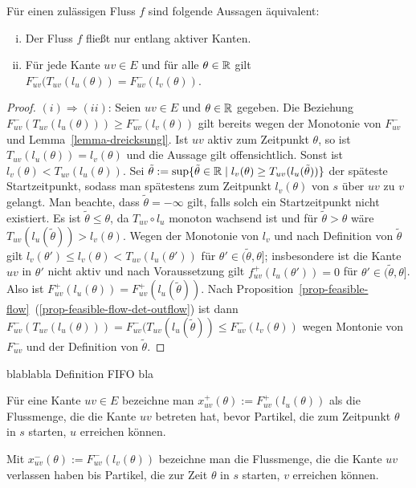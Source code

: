 \begin{lemma}
	Für einen zulässigen Fluss $f$ sind folgende Aussagen äquivalent:
	\begin{enumerate}[(i)]
		\item Der Fluss $f$ fließt nur entlang aktiver Kanten.
		\item Für jede Kante $uv\in E$ und für alle $\theta\in\mathbb{R}$ gilt $F_{uv}^-(T_{uv}(l_u(\theta)) = F_{uv}^-(l_v(\theta))$.
	\end{enumerate}
\end{lemma}
\begin{proof}
	$(i)\Rightarrow (ii)$: Seien $uv\in E$ und $\theta\in\mathbb{R}$ gegeben.
	Die Beziehung $F_{uv}^-(T_{uv}(l_u(\theta))) \geq F_{uv}^-(l_v(\theta))$ gilt bereits wegen der Monotonie von $F_{uv}^-$ und Lemma~\ref{lemma-dreicksungl}.
	Ist $uv$ aktiv zum Zeitpunkt $\theta$, so ist $T_{uv}(l_u(\theta))=l_v(\theta)$ und die Aussage gilt offensichtlich.
	Sonst ist $l_v(\theta) < T_{uv}(l_u(\theta))$. 
	Sei $\tilde{\theta}:=\sup\{ \tilde{\theta}\in\mathbb{R} \mid l_v(\theta) \geq T_{uv}(l_u(\tilde{\theta})) \}$ der späteste Startzeitpunkt, sodass man spätestens zum Zeitpunkt $l_v(\theta)$ von $s$ über $uv$ zu $v$ gelangt.
	Man beachte, dass $\tilde{\theta}=-\infty$ gilt, falls solch ein Startzeitpunkt nicht existiert.
	Es ist $\tilde{\theta} \leq \theta$, da $T_{uv}\circ l_u$ monoton wachsend ist und für $\tilde{\theta} > \theta$ wäre $T_{uv}(l_u(\tilde{\theta})) > l_v(\theta)$.
	Wegen der Monotonie von $l_v$ und nach Definition von $\tilde{\theta}$ gilt $l_v(\theta')\leq l_v(\theta)< T_{uv}(l_u(\theta'))$ für $\theta'\in (\tilde{\theta}, \theta]$; insbesondere ist die Kante $uv$ in $\theta'$ nicht aktiv und nach Voraussetzung gilt $f_{uv}^+(l_u(\theta')) = 0$ für $\theta'\in (\tilde{\theta}, \theta]$. 
	Also ist $F_{uv}^+(l_u(\theta)) = F_{uv}^+(l_u(\tilde{\theta}))$. Nach Proposition~\ref{prop-feasible-flow}~(\ref{prop-feasible-flow-det-outflow}) ist dann $F_{uv}^-(T_{uv}(l_u(\theta))) = F_{uv}^-(T_{uv}(l_u(\tilde{\theta}))\leq F_{uv}^-(l_v(\theta))$ wegen Montonie von $F_{uv}^-$ und der Definition von $\tilde{\theta}$.
	
\end{proof}


blablabla Definition FIFO bla

\begin{definition}
	Für eine Kante $uv\in E$ bezeichne man $x_{uv}^+(\theta):= F_{uv}^+(l_u(\theta))$ als die Flussmenge, die die Kante $uv$ betreten hat, bevor Partikel, die zum Zeitpunkt $\theta$ in $s$ starten, $u$ erreichen können.
	
	Mit $x_{uv}^-(\theta):= F^-_{uv}(l_v(\theta))$ bezeichne man die Flussmenge, die die Kante $uv$ verlassen haben bis Partikel, die zur Zeit $\theta$ in $s$ starten, $v$ erreichen können.
	
	
\end{definition}
